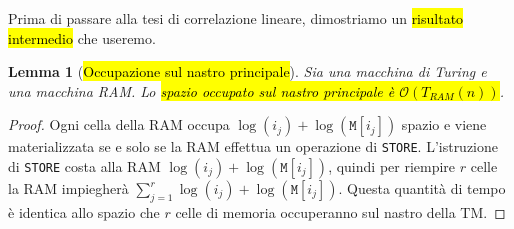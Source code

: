 \documentclass[a4paper,11pt,oneside]{article}
\theoremstyle{plain}
\newtheorem{lem}{Lemma}[section]
\theoremstyle{definition}
\theoremstyle{remark}
\begin{document}
Prima di passare alla tesi di correlazione lineare, dimostriamo un \hl{risultato
intermedio} che useremo.

\begin{lem}[\hl{Occupazione sul nastro principale}]\label{thm:occupazione-nastro}
  Sia una macchina di Turing e una macchina RAM\@. Lo \hl{spazio occupato sul
  nastro principale è $\mathcal{O}(T_{RAM}(n))$}.
\end{lem}
\begin{proof}
  Ogni cella della RAM occupa $\log(i_j)+\log(\mathtt{M}[i_j])$ spazio e viene
  materializzata se e solo se la RAM effettua un operazione di \texttt{STORE}.
  L'istruzione di \texttt{STORE} costa alla RAM $\log(i_j) +
  \log(\mathtt{M}[i_j])$, quindi per riempire $r$ celle la RAM impiegherà
  $\sum_{j=1}^r \log(i_j) + \log(\mathtt{M}[i_j])$. Questa quantità di tempo è
  identica allo spazio che $r$ celle di memoria occuperanno sul nastro della
  TM\@.
\end{proof}
\end{document}
